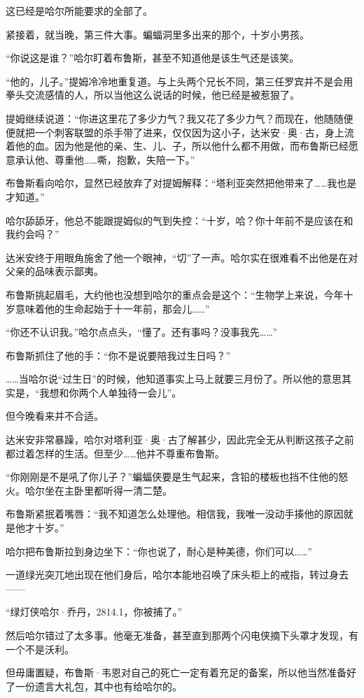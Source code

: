\documentclass[../main]{subfiles}
\begin{document}
这已经是哈尔所能要求的全部了。

紧接着，就当晚，第三件大事。蝙蝠洞里多出来的那个，十岁小男孩。

“你说这是谁？”哈尔盯着布鲁斯，甚至不知道他是该生气还是该笑。

“他的，儿子。”提姆冷冷地重复道。与上头两个兄长不同，第三任罗宾并不是会用拳头交流感情的人，所以当他这么说话的时候，他已经是被惹狠了。

提姆继续说道：“你进这里花了多少力气？我又花了多少力气？而现在，他随随便便就把一个刺客联盟的杀手带了进来，仅仅因为这小子，达米安·奥·古，身上流着他的血。因为他是他的亲、生、儿、子，所以他什么都不用做，而布鲁斯已经愿意承认他、尊重他……嘶，抱歉，失陪一下。”

布鲁斯看向哈尔，显然已经放弃了对提姆解释：“塔利亚突然把他带来了……我也是才知道。”

哈尔舔舔牙，他总不能跟提姆似的气到失控：“十岁，哈？你十年前不是应该在和我约会吗？”

达米安终于用眼角施舍了他一个眼神，“切”了一声。哈尔实在很难看不出他是在对父亲的品味表示鄙夷。

布鲁斯挑起眉毛，大约他也没想到哈尔的重点会是这个：“生物学上来说，今年十岁意味着他的生命起始于十一年前，那会儿\ldots\ldots”

“你还不认识我。”哈尔点点头，“懂了。还有事吗？没事我先\ldots\ldots”

布鲁斯抓住了他的手：“你不是说要陪我过生日吗？”

……当哈尔说“过生日”的时候，他知道事实上马上就要三月份了。所以他的意思其实是，“我想和你两个人单独待一会儿”。

但今晚看来并不合适。

达米安非常暴躁，哈尔对塔利亚·奥·古了解甚少，因此完全无从判断这孩子之前都过着怎样的生活。但至少……他并不尊重布鲁斯。

“你刚刚是不是吼了你儿子？”蝙蝠侠要是生气起来，含铅的楼板也挡不住他的怒火。哈尔坐在主卧里都听得一清二楚。

布鲁斯紧抿着嘴唇：“我不知道怎么处理他。相信我，我唯一没动手揍他的原因就是他才十岁。”

哈尔把布鲁斯拉到身边坐下：“你也说了，耐心是种美德，你们可以\ldots\ldots”

一道绿光突兀地出现在他们身后，哈尔本能地召唤了床头柜上的戒指，转过身去——

“绿灯侠哈尔·乔丹，2814.1，你被捕了。”

然后哈尔错过了太多事。他毫无准备，甚至直到那两个闪电侠摘下头罩才发现，有一个不是沃利。

但毋庸置疑，布鲁斯·韦恩对自己的死亡一定有着充足的备案，所以他当然准备好了一份遗言大礼包，其中也有给哈尔的。
\end{document}
